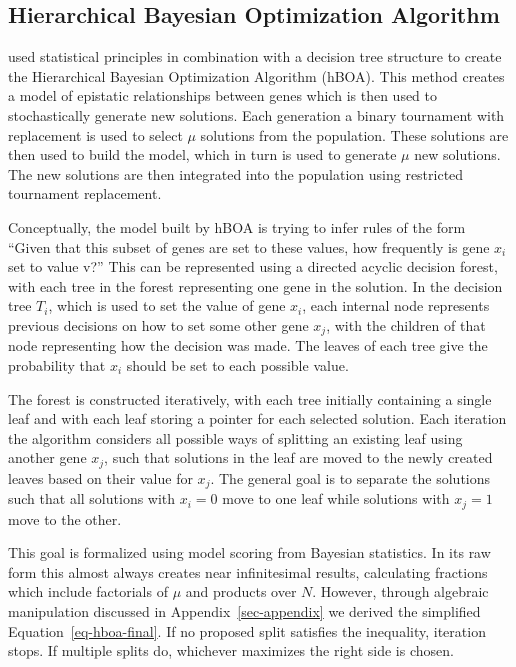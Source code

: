 \documentclass[twoside]{article}
\begin{document}
\subsection{Hierarchical Bayesian Optimization Algorithm}

\cite{pelikan:2006:hboa} used statistical principles in combination with a decision tree structure
to create the Hierarchical Bayesian Optimization Algorithm (hBOA). This method creates a model of
epistatic relationships between genes which is then used to stochastically generate new solutions.
Each generation a binary tournament with replacement is used to select $\mu$ solutions from
the population. These solutions are then used to build the model, which in turn is used to generate $\mu$ new
solutions. The new solutions are then integrated into the population using restricted tournament
replacement.

Conceptually, the model built by hBOA is trying to infer rules of the form ``Given that this
subset of genes are set to these values, how frequently is gene $x_i$ set to value v?'' This can
be represented using a directed acyclic decision forest, with each tree in the forest representing one gene
in the solution. In the decision tree $T_i$, which is used to set the value of gene $x_i$,
each internal node represents previous decisions on how to set
some other gene $x_j$, with the children of that node representing how the decision was made. The
leaves of each tree give the probability that $x_i$ should be set to each possible value.

The forest is constructed iteratively, with each tree initially containing a single leaf
and with each leaf storing a pointer for each selected solution. Each iteration the algorithm considers
all possible ways of splitting an existing leaf using another gene $x_j$, such that solutions in the
leaf are moved to the newly created leaves based on their value for $x_j$. The general goal is to
separate the solutions such that all solutions with $x_i = 0$ move to one leaf while solutions with
$x_j = 1$ move to the other.

This goal is formalized using model scoring from Bayesian statistics. In its raw form this
almost always creates near infinitesimal results, calculating fractions which include factorials of $\mu$
and products over $N$. However, through algebraic manipulation discussed in Appendix~\ref{sec-appendix} we
derived the simplified Equation~\ref{eq-hboa-final}. If no proposed split satisfies the inequality, iteration stops.
If multiple splits do, whichever maximizes the right side is chosen.
\end{document}
